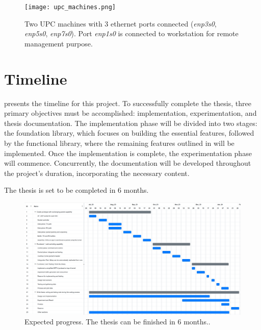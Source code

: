 \begin{figure}[H]
	\centering
	\texttt{[image: upc\_machines.png]}
	\caption{Two UPC machines with 3 ethernet ports connected (\textit{enp3s0}, \textit{enp5s0}, \textit{enp7s0}). Port \textit{enp1s0} is connected to workstation for remote management purpose.}
	\label{fig:plan:upc_machines}
\end{figure}


\section{Timeline}
 presents the timeline for this project. 
To successfully complete the thesis, three primary objectives must be accomplished: implementation, experimentation, and thesis documentation.
The implementation phase will be divided into two stages: the foundation library, which focuses on building the essential features, followed by the functional library, where the remaining features outlined in  will be implemented. 
Once the implementation is complete, the experimentation phase will commence. 
Concurrently, the documentation will be developed throughout the project's duration, incorporating the necessary content.

The thesis is set to be completed in 6 months.

\clearpage
\begin{figure}
    \centering
    \includegraphics[width=1.0\textwidth]{resources/images/TIMELINE.PNG}
    \caption{Expected progress. The thesis can be finished in 6 months..}
	\label{fig:plan:TIMELINE}
  \end{figure}







